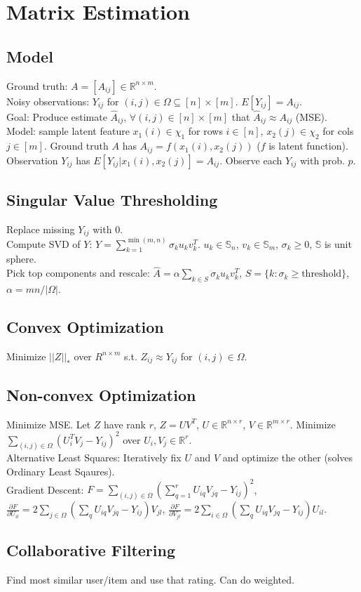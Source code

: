 \section{Matrix Estimation}

\subsection*{Model}
Ground truth: $A = [A_{ij}] \in \mathbb{R}^{n \times m}$.\\
Noisy observations: $Y_{ij}$ for $(i, j) \in \Omega \subseteq [n] \times [m]$. $E[Y_{ij}] = A_{ij}$.\\
Goal: Produce estimate $\hat{A}_{ij}$, $\forall (i, j) \in [n] \times [m]$ that $\hat{A}_{ij}\approx A_{ij}$ (MSE).\\
Model: sample latent feature $x_1(i) \in \chi_1$ for rows $i \in [n]$, $x_2(j) \in \chi_2$ for cols $j \in [m]$. Ground truth $A$ has $A_{ij} = f(x_1(i), x_2(j))$ ($f$ is latent function). Observation $Y_{ij}$ has $E[Y_{ij} | x_1(i), x_2(j)] = A_{ij}.$ Observe each $Y_{ij}$ with prob. $p$.

\subsection*{Singular Value Thresholding}

Replace missing $Y_{ij}$ with $0$.\\
Compute SVD of $Y$: $Y = \sum_{k=1}^{\min(m, n)}\sigma_k u_k v_k^T$. $u_k \in \mathbb{S}_n$, $v_k \in \mathbb{S}_m$, $\sigma_k \geq 0$, $\mathbb{S}$ is unit sphere.\\
Pick top components and rescale: $\hat{A} = \alpha \sum_{k \in S} \sigma_k u_k v_k^T$, $S = \{k: \sigma_k \geq \text{threshold}\}$, $\alpha=mn/|\Omega|$.

\subsection*{Convex Optimization}

Minimize $||Z||_*$ over $R^{n\times m}$ s.t. $Z_{ij} \approx Y_{ij}$ for $(i, j) \in \Omega$.\\

\subsection*{Non-convex Optimization}

Minimize MSE. Let $Z$ have rank $r$, $Z = UV^T$, $U \in \mathbb{R}^{n \times r}$, $V \in \mathbb{R}^{m \times r}$. Minimize $\sum_{(i, j)\in\Omega}(U_i^T V_j - Y_{ij})^2$ over $U_i, V_j \in \mathbb{R}^r$.\\
Alternative Least Squares: Iteratively fix $U$ and $V$ and optimize the other (solves Ordinary Least Sqaures).\\
Gradient Descent: $F = \sum_{(i, j)\in \Omega}(\sum_{q=1}^r U_{iq} V_{jq} - Y_{ij})^2$, $\frac{\partial F}{\partial U_{il}} = 2 \sum_{j \in \Omega} (\sum_q U_{iq}V_{jq} - Y_{ij})V_{jl}$, $\frac{\partial F}{\partial V_{jl}} = 2 \sum_{i \in \Omega} (\sum_q U_{iq}V_{jq} - Y_{ij})U_{il}$.

\subsection*{Collaborative Filtering}

Find most similar user/item and use that rating. Can do weighted.

